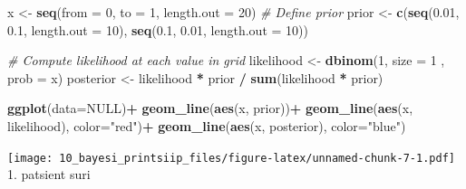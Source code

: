\documentclass[]{book}
\newenvironment{Shaded}{\begin{snugshade}}{\end{snugshade}}
\newcommand{\KeywordTok}[1]{\textcolor[rgb]{0.13,0.29,0.53}{\textbf{#1}}}
\newcommand{\DataTypeTok}[1]{\textcolor[rgb]{0.13,0.29,0.53}{#1}}
\newcommand{\DecValTok}[1]{\textcolor[rgb]{0.00,0.00,0.81}{#1}}
\newcommand{\FloatTok}[1]{\textcolor[rgb]{0.00,0.00,0.81}{#1}}
\newcommand{\StringTok}[1]{\textcolor[rgb]{0.31,0.60,0.02}{#1}}
\newcommand{\CommentTok}[1]{\textcolor[rgb]{0.56,0.35,0.01}{\textit{#1}}}
\newcommand{\OtherTok}[1]{\textcolor[rgb]{0.56,0.35,0.01}{#1}}
\newcommand{\OperatorTok}[1]{\textcolor[rgb]{0.81,0.36,0.00}{\textbf{#1}}}
\newcommand{\NormalTok}[1]{#1}
\begin{document}
\begin{Shaded}
\begin{Highlighting}[]
\NormalTok{x <-}\StringTok{ }\KeywordTok{seq}\NormalTok{(}\DataTypeTok{from =} \DecValTok{0}\NormalTok{, }\DataTypeTok{to =} \DecValTok{1}\NormalTok{, }\DataTypeTok{length.out =} \DecValTok{20}\NormalTok{)}
\CommentTok{# Define prior}
\NormalTok{prior <-}\StringTok{ }\KeywordTok{c}\NormalTok{(}\KeywordTok{seq}\NormalTok{(}\FloatTok{0.01}\NormalTok{, }\FloatTok{0.1}\NormalTok{, }\DataTypeTok{length.out =} \DecValTok{10}\NormalTok{), }\KeywordTok{seq}\NormalTok{(}\FloatTok{0.1}\NormalTok{, }\FloatTok{0.01}\NormalTok{, }\DataTypeTok{length.out =} \DecValTok{10}\NormalTok{))}

\CommentTok{# Compute likelihood at each value in grid}
\NormalTok{likelihood <-}\StringTok{ }\KeywordTok{dbinom}\NormalTok{(}\DecValTok{1}\NormalTok{, }\DataTypeTok{size =} \DecValTok{1}\NormalTok{ , }\DataTypeTok{prob =}\NormalTok{ x)}
\NormalTok{posterior <-}\StringTok{ }\NormalTok{likelihood }\OperatorTok{*}\StringTok{ }\NormalTok{prior }\OperatorTok{/}\StringTok{ }\KeywordTok{sum}\NormalTok{(likelihood }\OperatorTok{*}\StringTok{ }\NormalTok{prior)}

\KeywordTok{ggplot}\NormalTok{(}\DataTypeTok{data=}\OtherTok{NULL}\NormalTok{)}\OperatorTok{+}
\StringTok{  }\KeywordTok{geom_line}\NormalTok{(}\KeywordTok{aes}\NormalTok{(x, prior))}\OperatorTok{+}
\StringTok{  }\KeywordTok{geom_line}\NormalTok{(}\KeywordTok{aes}\NormalTok{(x, likelihood), }\DataTypeTok{color=}\StringTok{"red"}\NormalTok{)}\OperatorTok{+}
\StringTok{  }\KeywordTok{geom_line}\NormalTok{(}\KeywordTok{aes}\NormalTok{(x, posterior), }\DataTypeTok{color=}\StringTok{"blue"}\NormalTok{)}
\end{Highlighting}
\end{Shaded}

\texttt{[image: 10\_bayesi\_printsiip\_files/figure-latex/unnamed-chunk-7-1.pdf]}
1. patsient suri
\end{document}
